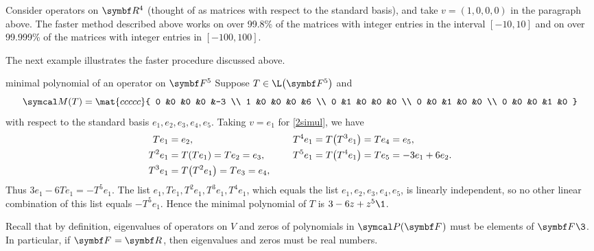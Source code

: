 
Consider operators on $\R4$ (thought of as  matrices with respect to the standard basis), and take $v = (1,0,0,0)$ in the paragraph above. The faster method described above works on over 99.8\% of the  matrices with integer entries in the interval $[-10,10]$ and on over 99.999\% of the  matrices with integer entries in $[-100,100]$.

The next example illustrates the faster procedure discussed above.

\begin{example}[141]{minimal polynomial of an operator on\/ $\F5$}
Suppose $T \in \L\paren[\big]{\F{5}}$ and
\vspace{-.12in}
\[
\M(T) = \mat{ccccc}{
0 &0 &0 &0 &-3 \\
1 &0 &0 &0 &6 \\
0 &1 &0 &0 &0 \\
0 &0 &1 &0 &0 \\
0 &0 &0 &1 &0 }
\]
with respect to the standard basis $e_1, e_2, e_3, e_4, e_5$. Taking $v = e_1$ for \ref{2simul}, we have
\begin{align*}
Te_1 &= e_2, \quad \quad &T^4e_1 &= T\paren[\big]{T^3e_1} = Te_4 = e_5,\\
T^2e_1 &= T(Te_1) = Te_2 = e_3, \quad \quad &T^5 e_1 & = T\paren[\big]{T^4e_1} = Te_5 = -3e_1 + 6e_2. \\
T^3e_1 &= T\paren[\big]{T^2e_1} = Te_3 = e_4,
\end{align*}
Thus $3e_1 - 6 Te_1 = -T^5 e_1$. The list $e_1, Te_1, T^2 e_1, T^3 e_1, T^4 e_1$, which equals the list $e_1, e_2, e_3, e_4, e_5$, is linearly independent, so no other linear combination of this list equals $-T^5e_1$. Hence the minimal polynomial of $T$ is $3 - 6z + z^5\1$.
\end{example}

Recall that by definition, eigenvalues of operators on $V$ and zeros of polynomials in $\P(\F{})$ must be elements of $\F{}\3$. In particular, if $\F{} = \R{}$, then eigenvalues and zeros must be real numbers.


